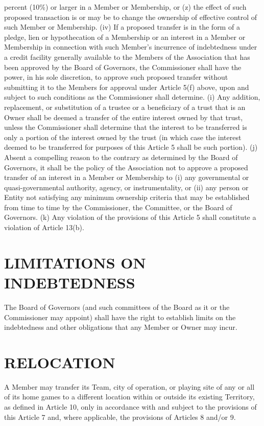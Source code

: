 \documentclass[]{book}
\theoremstyle{definition}
\theoremstyle{definition}
\theoremstyle{definition}
\theoremstyle{remark}
\begin{document}
percent (10\%) or larger in a Member or Membership, or (z) the effect of
such proposed transaction is or may be to change the ownership of
effective control of such Member or Membership. (iv) If a proposed
transfer is in the form of a pledge, lien or hypothecation of a
Membership or an interest in a Member or Membership in connection with
such Member's incurrence of indebtedness under a credit facility
generally available to the Members of the Association that has been
approved by the Board of Governors, the Commissioner shall have the
power, in his sole discretion, to approve such proposed transfer without
submitting it to the Members for approval under Article 5(f) above, upon
and subject to such conditions as the Commissioner shall determine. (i)
Any addition, replacement, or substitution of a trustee or a beneficiary
of a trust that is an Owner shall be deemed a transfer of the entire
interest owned by that trust, unless the Commissioner shall determine
that the interest to be transferred is only a portion of the interest
owned by the trust (in which case the interest deemed to be transferred
for purposes of this Article 5 shall be such portion). (j) Absent a
compelling reason to the contrary as determined by the Board of
Governors, it shall be the policy of the Association not to approve a
proposed transfer of an interest in a Member or Membership to (i) any
governmental or quasi-governmental authority, agency, or
instrumentality, or (ii) any person or Entity not satisfying any minimum
ownership criteria that may be established from time to time by the
Commissioner, the Committee, or the Board of Governors. (k) Any
violation of the provisions of this Article 5 shall constitute a
violation of Article 13(b).

\section{LIMITATIONS ON INDEBTEDNESS}\label{limitations-on-indebtedness}

The Board of Governors (and such committees of the Board as it or the
Commissioner may appoint) shall have the right to establish limits on
the indebtedness and other obligations that any Member or Owner may
incur.

\section{RELOCATION}\label{relocation}

A Member may transfer its Team, city of operation, or playing site of
any or all of its home games to a different location within or outside
its existing Territory, as defined in Article 10, only in accordance
with and subject to the provisions of this Article 7 and, where
applicable, the provisions of Articles 8 and/or 9.
\end{document}
